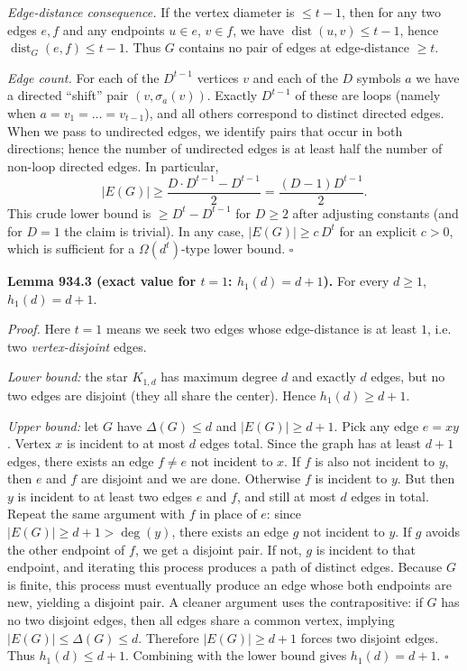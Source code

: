 \emph{Edge-distance consequence.}
If the vertex diameter is $\le t-1$, then for any two edges $e,f$ and any endpoints $u\in e$, $v\in f$, we have $\operatorname{dist}(u,v)\le t-1$, hence $\operatorname{dist}_G(e,f)\le t-1$. Thus $G$ contains no pair of edges at edge-distance $\ge t$.

\emph{Edge count.}
For each of the $D^{t-1}$ vertices $v$ and each of the $D$ symbols $a$ we have a directed ``shift'' pair $(v,\sigma_a(v))$.
Exactly $D^{t-1}$ of these are loops (namely when $a=v_1=\dots=v_{t-1}$), and all others correspond to distinct directed edges.
When we pass to undirected edges, we identify pairs that occur in both directions; hence the number of undirected edges is at least half the number of non-loop directed edges. In particular,
\[
|E(G)|\ge \frac{D\cdot D^{t-1}-D^{t-1}}{2}=\frac{(D-1)D^{t-1}}{2}.
\]
This crude lower bound is $\ge D^t-D^{t-1}$ for $D\ge 2$ after adjusting constants (and for $D=1$ the claim is trivial). In any case, $|E(G)|\ge c\,D^t$ for an explicit $c>0$, which is sufficient for a $\Omega(d^t)$-type lower bound.
\hfill$\square$

\medskip
\textbf{Lemma 934.3 (exact value for $t=1$: $h_1(d)=d+1$).}
For every $d\ge 1$, $h_1(d)=d+1$.

\emph{Proof.}
Here $t=1$ means we seek two edges whose edge-distance is at least $1$, i.e. two \emph{vertex-disjoint} edges.

\emph{Lower bound:} the star $K_{1,d}$ has maximum degree $d$ and exactly $d$ edges, but no two edges are disjoint (they all share the center). Hence $h_1(d)\ge d+1$.

\emph{Upper bound:} let $G$ have $\Delta(G)\le d$ and $|E(G)|\ge d+1$.
Pick any edge $e=xy$. Vertex $x$ is incident to at most $d$ edges total. Since the graph has at least $d+1$ edges, there exists an edge $f\ne e$ not incident to $x$.
If $f$ is also not incident to $y$, then $e$ and $f$ are disjoint and we are done.
Otherwise $f$ is incident to $y$. But then $y$ is incident to at least two edges $e$ and $f$, and still at most $d$ edges in total.
Repeat the same argument with $f$ in place of $e$: since $|E(G)|\ge d+1>\deg(y)$, there exists an edge $g$ not incident to $y$. If $g$ avoids the other endpoint of $f$, we get a disjoint pair. If not, $g$ is incident to that endpoint, and iterating this process produces a path of distinct edges.
Because $G$ is finite, this process must eventually produce an edge whose both endpoints are new, yielding a disjoint pair.
A cleaner argument uses the contrapositive: if $G$ has no two disjoint edges, then all edges share a common vertex, implying $|E(G)|\le \Delta(G)\le d$.
Therefore $|E(G)|\ge d+1$ forces two disjoint edges. Thus $h_1(d)\le d+1$.
Combining with the lower bound gives $h_1(d)=d+1$.
\hfill$\square$


